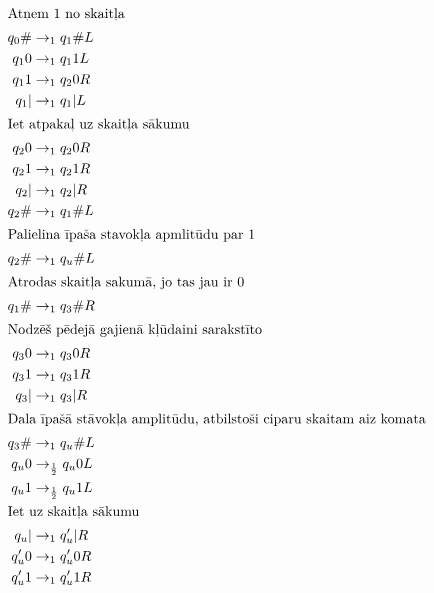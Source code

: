 \documentclass{ludis}
\begin{document}
\begin{multicols}{2}
	\begin{align*}
	\shortintertext{Atņem 1 no skaitļa}
		q_0\# & \rightarrow_1 q_1\#L\\
		q_10 & \rightarrow_1 q_11L\\
		q_11 & \rightarrow_1 q_20R\\
		q_1| & \rightarrow_1 q_1|L\\
	\shortintertext{Iet atpakaļ uz skaitļa sākumu}
		q_20 & \rightarrow_1 q_20R\\
		q_21 & \rightarrow_1 q_21R\\
		q_2| & \rightarrow_1 q_2|R\\
		q_2\# & \rightarrow_1 q_1\#L\\
	\shortintertext{Palielina īpaša stavokļa apmlitūdu par 1}
		q_2\# & \rightarrow_1 q_u\#L\\
	\shortintertext{Atrodas skaitļa sakumā, jo tas jau ir 0}
		q_1\# & \rightarrow_1 q_3\#R\\
	\shortintertext{Nodzēš pēdejā gajienā kļūdaini sarakstīto}
		q_30 & \rightarrow_1 q_30R\\
		q_31 & \rightarrow_1 q_31R\\
		q_3| & \rightarrow_1 q_3|R\\
	\shortintertext{Dala īpašā stāvokļa amplitūdu, atbilstoši ciparu skaitam aiz komata}
		q_3\# & \rightarrow_1 q_u\#L\\
		q_u0 & \rightarrow_\frac{1}{2} q_u0L\\
		q_u1 & \rightarrow_\frac{1}{2} q_u1L\\
	\shortintertext{Iet uz skaitļa sākumu}
		q_u| & \rightarrow_1 q_u'|R\\
		q_u'0 & \rightarrow_1 q_u'0R\\
		q_u'1 & \rightarrow_1 q_u'1R\\
	\end{align*}
\end{multicols}
\end{document}
